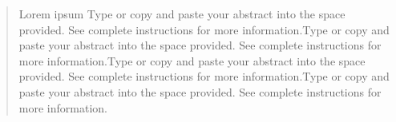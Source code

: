 \begin{abstract}Lorem ipsum Type or copy and paste your abstract into the space provided. See complete instructions for more information.Type or copy and paste your abstract into the space provided. See complete instructions for more information.Type or copy and paste your abstract into the space provided. See complete instructions for more information.Type or copy and paste your abstract into the space provided. See complete instructions for more information.\end{abstract}